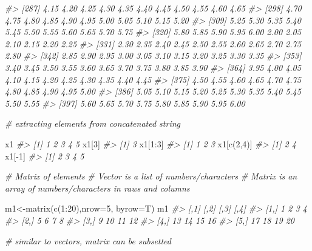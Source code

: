 \documentclass[
]{book}
\newenvironment{Shaded}{\begin{snugshade}}{\end{snugshade}}
\newcommand{\AttributeTok}[1]{\textcolor[rgb]{0.77,0.63,0.00}{#1}}
\newcommand{\CommentTok}[1]{\textcolor[rgb]{0.56,0.35,0.01}{\textit{#1}}}
\newcommand{\DecValTok}[1]{\textcolor[rgb]{0.00,0.00,0.81}{#1}}
\newcommand{\FunctionTok}[1]{\textcolor[rgb]{0.00,0.00,0.00}{#1}}
\newcommand{\NormalTok}[1]{#1}
\newcommand{\OtherTok}[1]{\textcolor[rgb]{0.56,0.35,0.01}{#1}}
\newcommand{\SpecialCharTok}[1]{\textcolor[rgb]{0.00,0.00,0.00}{#1}}
\begin{document}
\begin{Shaded}
\begin{Highlighting}[]
\CommentTok{\#\textgreater{} [287] 4.15 4.20 4.25 4.30 4.35 4.40 4.45 4.50 4.55 4.60 4.65}
\CommentTok{\#\textgreater{} [298] 4.70 4.75 4.80 4.85 4.90 4.95 5.00 5.05 5.10 5.15 5.20}
\CommentTok{\#\textgreater{} [309] 5.25 5.30 5.35 5.40 5.45 5.50 5.55 5.60 5.65 5.70 5.75}
\CommentTok{\#\textgreater{} [320] 5.80 5.85 5.90 5.95 6.00 2.00 2.05 2.10 2.15 2.20 2.25}
\CommentTok{\#\textgreater{} [331] 2.30 2.35 2.40 2.45 2.50 2.55 2.60 2.65 2.70 2.75 2.80}
\CommentTok{\#\textgreater{} [342] 2.85 2.90 2.95 3.00 3.05 3.10 3.15 3.20 3.25 3.30 3.35}
\CommentTok{\#\textgreater{} [353] 3.40 3.45 3.50 3.55 3.60 3.65 3.70 3.75 3.80 3.85 3.90}
\CommentTok{\#\textgreater{} [364] 3.95 4.00 4.05 4.10 4.15 4.20 4.25 4.30 4.35 4.40 4.45}
\CommentTok{\#\textgreater{} [375] 4.50 4.55 4.60 4.65 4.70 4.75 4.80 4.85 4.90 4.95 5.00}
\CommentTok{\#\textgreater{} [386] 5.05 5.10 5.15 5.20 5.25 5.30 5.35 5.40 5.45 5.50 5.55}
\CommentTok{\#\textgreater{} [397] 5.60 5.65 5.70 5.75 5.80 5.85 5.90 5.95 6.00}

\CommentTok{\# extracting elements from concatenated string}

\NormalTok{x1}
\CommentTok{\#\textgreater{} [1] 1 2 3 4 5}
\NormalTok{x1[}\DecValTok{3}\NormalTok{]}
\CommentTok{\#\textgreater{} [1] 3}
\NormalTok{x1[}\DecValTok{1}\SpecialCharTok{:}\DecValTok{3}\NormalTok{]}
\CommentTok{\#\textgreater{} [1] 1 2 3}
\NormalTok{x1[}\FunctionTok{c}\NormalTok{(}\DecValTok{2}\NormalTok{,}\DecValTok{4}\NormalTok{)]}
\CommentTok{\#\textgreater{} [1] 2 4}
\NormalTok{x1[}\SpecialCharTok{{-}}\DecValTok{1}\NormalTok{]}
\CommentTok{\#\textgreater{} [1] 2 3 4 5}

\CommentTok{\# Matrix of elements}
\CommentTok{\# Vector is a list of numbers/characters}
\CommentTok{\# Matrix is an array of numbers/characters in raws and columns}

\NormalTok{m1}\OtherTok{\textless{}{-}}\FunctionTok{matrix}\NormalTok{(}\FunctionTok{c}\NormalTok{(}\DecValTok{1}\SpecialCharTok{:}\DecValTok{20}\NormalTok{),}\AttributeTok{nrow=}\DecValTok{5}\NormalTok{, }\AttributeTok{byrow=}\NormalTok{T)}
\NormalTok{m1}
\CommentTok{\#\textgreater{}      [,1] [,2] [,3] [,4]}
\CommentTok{\#\textgreater{} [1,]    1    2    3    4}
\CommentTok{\#\textgreater{} [2,]    5    6    7    8}
\CommentTok{\#\textgreater{} [3,]    9   10   11   12}
\CommentTok{\#\textgreater{} [4,]   13   14   15   16}
\CommentTok{\#\textgreater{} [5,]   17   18   19   20}

\CommentTok{\# similar to vectors, matrix can be subsetted}


\end{Highlighting}
\end{Shaded}
\end{document}
